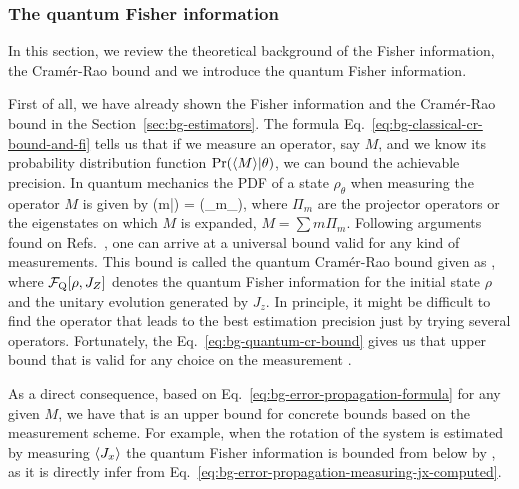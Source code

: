 \subsubsection{The quantum Fisher information}

In this section, we review the theoretical background of the Fisher information, the Cram\'er-Rao bound and we introduce the quantum Fisher information.

First of all, we have already shown the Fisher information and the Cram\'er-Rao bound in the Section~\ref{sec:bg-estimators}.
The formula Eq.~\eqref{eq:bg-classical-cr-bound-and-fi} tells us that if we measure an operator, say $M$, and we know its probability distribution function $\text{Pr}(\langle M \rangle|\theta)$, we can bound the achievable precision.
In quantum mechanics the PDF of a state $\rho_\theta$ when measuring the operator $M$ is given by
\be
  \prob(m|\theta) = \tr({\Pi_{m}\rho_\theta}),
\ee
where $\Pi_{m}$ are the projector operators or the eigenstates on which $M$ is expanded, $M = \sum m \Pi_m$.
Following arguments found on Refs.~\citep{Giovannetti2004, Paris2009}, one can arrive at a universal bound valid for any kind of measurements.
This bound is called the quantum Cram\'er-Rao bound given as
\be
  \label{eq:bg-quantum-cr-bound}
  \varinv{\theta} \leq {},
\ee
where $\mathcal{F}_{\textnormal{Q}}[{\textstyle \rho, J_Z}]$ denotes the quantum Fisher information for the initial state $\rho$ and the unitary evolution generated by $J_z$.
In principle, it might be difficult to find the operator that leads to the best estimation precision just by trying several operators.
Fortunately, the Eq.~\eqref{eq:bg-quantum-cr-bound} gives us that upper bound that is valid for any choice on the measurement \citep{Helstrom1976, Holevo1982}.

As a direct consequence, based on Eq.~\eqref{eq:bg-error-propagation-formula} for any given $M$, we have that
\be
   \geq {}
\ee
is an upper bound for concrete bounds based on the measurement scheme.
For example, when the rotation of the system is estimated by measuring $\langle J_x \rangle$ the quantum Fisher information is bounded from below by \citep{Pezze2009}
\be
  \label{eq:bg-pezze-bound}
   \geq {},
\ee
as it is directly infer from Eq.~\eqref{eq:bg-error-propagation-measuring-jx-computed}.

